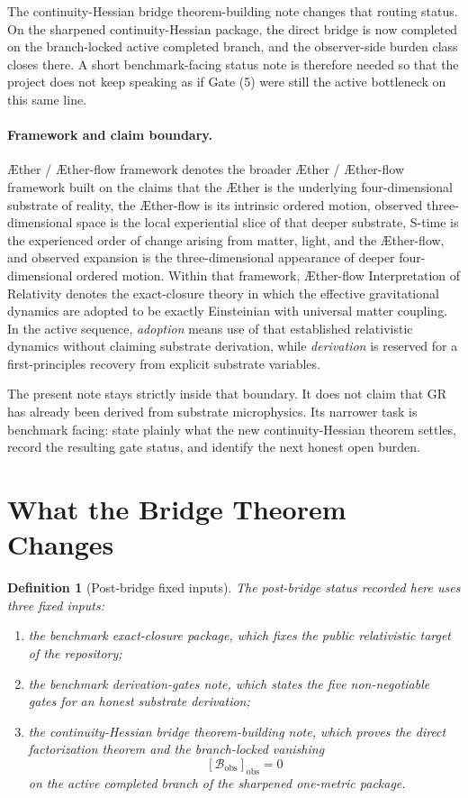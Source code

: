 \documentclass[11pt]{article}
\newcommand{\Aether}{\AE{}ther}
\newcommand{\Aflow}{\AE{}ther-flow}
\newcommand{\TheoryName}{\Aflow{} Interpretation of Relativity}
\newcommand{\TheoryProgram}{\Aether{} / \Aflow{} framework}
\newcommand{\ObsBurden}{\mathcal{B}_{\mathrm{obs}}}
\newcommand{\ObserverClass}[1]{\left[#1\right]_{\mathrm{obs}}}
\newtheorem{definition}{Definition}
\begin{document}
The continuity-Hessian bridge theorem-building note changes that routing status. On the sharpened continuity-Hessian package, the direct bridge is now completed on the branch-locked active completed branch, and the observer-side burden class closes there. A short benchmark-facing status note is therefore needed so that the project does not keep speaking as if Gate (5) were still the active bottleneck on this same line.

\paragraph{Framework and claim boundary.}
\TheoryProgram{} denotes the broader \Aether{} / \Aflow{} framework built on the claims that the \Aether{} is the underlying four-dimensional substrate of reality, the \Aflow{} is its intrinsic ordered motion, observed three-dimensional space is the local experiential slice of that deeper substrate, S-time is the experienced order of change arising from matter, light, and the \Aflow{}, and observed expansion is the three-dimensional appearance of deeper four-dimensional ordered motion. Within that framework, \TheoryName{} denotes the exact-closure theory in which the effective gravitational dynamics are adopted to be exactly Einsteinian with universal matter coupling. In the active sequence, \emph{adoption} means use of that established relativistic dynamics without claiming substrate derivation, while \emph{derivation} is reserved for a first-principles recovery from explicit substrate variables.

The present note stays strictly inside that boundary. It does not claim that GR has already been derived from substrate microphysics. Its narrower task is benchmark facing: state plainly what the new continuity-Hessian theorem settles, record the resulting gate status, and identify the next honest open burden.

\section{What the Bridge Theorem Changes}

\begin{definition}[Post-bridge fixed inputs]
The post-bridge status recorded here uses three fixed inputs:
\begin{enumerate}
    \item the benchmark exact-closure package, which fixes the public relativistic target of the repository;
    \item the benchmark derivation-gates note, which states the five non-negotiable gates for an honest substrate derivation;
    \item the continuity-Hessian bridge theorem-building note, which proves the direct factorization theorem and the branch-locked vanishing
    \[
    \ObserverClass{\ObsBurden}=0
    \]
    on the active completed branch of the sharpened one-metric package.
\end{enumerate}
\end{definition}
\end{document}
